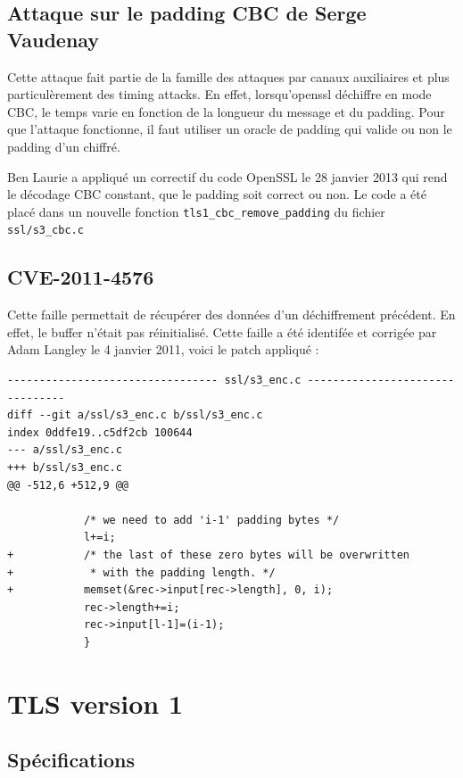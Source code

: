 \documentclass[a4paper,11pt,french]{article}
\begin{document}
\subsection{\label{Vaudenay}Attaque sur le padding CBC de Serge Vaudenay}

Cette attaque fait partie de la famille des attaques par canaux auxiliaires et plus particulèrement des timing attacks. En effet, lorsqu'openssl déchiffre en mode CBC, le temps varie en fonction de la longueur du message et du padding. Pour que l'attaque fonctionne, il faut utiliser un oracle de padding qui valide ou non le padding d'un chiffré.

Ben Laurie a appliqué un correctif du code OpenSSL le 28 janvier 2013 qui rend le décodage CBC constant, que le padding soit correct ou non. Le code a été placé dans un nouvelle fonction \verb+tls1_cbc_remove_padding+ du fichier \verb+ssl/s3_cbc.c+

\subsection{\label{CVE-2011-4576}CVE-2011-4576}

Cette faille permettait de récupérer des données d'un déchiffrement précédent. En effet, le buffer n'était pas réinitialisé. Cette faille a été identifée et corrigée par Adam Langley le 4 janvier 2011, voici le patch appliqué :

\begin{Verbatim}
--------------------------------- ssl/s3_enc.c --------------------------------
diff --git a/ssl/s3_enc.c b/ssl/s3_enc.c
index 0ddfe19..c5df2cb 100644
--- a/ssl/s3_enc.c
+++ b/ssl/s3_enc.c
@@ -512,6 +512,9 @@
 
            /* we need to add 'i-1' padding bytes */
            l+=i;
+           /* the last of these zero bytes will be overwritten
+            * with the padding length. */
+           memset(&rec->input[rec->length], 0, i);
            rec->length+=i;
            rec->input[l-1]=(i-1);
            }
\end{Verbatim}

\pagebreak
\section{TLS version 1}
\subsection{Spécifications}
\end{document}
